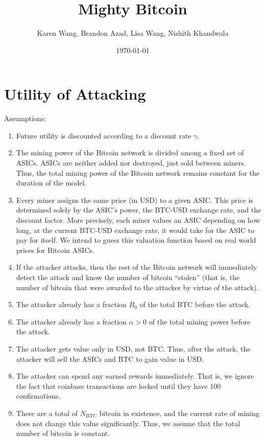 \documentclass[12pt]{article}
\title{Mighty Bitcoin}
\author{Karen Wang, Brandon Azad, Lisa Wang, Nishith Khandwala}
\date{\today}
\newcommand*{\ABtcOrig}{{B_0}}
\newcommand*{\NumBtc}{{N_{\mathrm{BTC}}}}
\begin{document}
\maketitle

\section{Utility of Attacking}

Assumptions:
\begin{enumerate}
  \item
    Future utility is discounted according to a discount rate $\gamma$.
  \item
    The mining power of the Bitcoin network is divided among a fixed set of
    ASICs. ASICs are neither added nor destroyed, just sold between miners.
    Thus, the total mining power of the Bitcoin network remains constant for
    the duration of the model.
  \item
    Every miner assigns the same price (in USD) to a given ASIC. This price is
    determined solely by the ASIC's power, the BTC-USD exchange rate, and the
    discount factor.
    More precisely, each miner values an ASIC depending on how long, at the
    current BTC-USD exchange rate, it would take for the ASIC to pay for
    itself. We intend to guess this valuation function based on real world
    prices for Bitcoin ASICs.
  \item
    If the attacker attacks, then the rest of the Bitcoin network will
    immediately detect the attack and know the number of bitcoin ``stolen''
    (that is, the number of bitcoin that were awarded to the attacker by virtue
    of the attack).
  \item
    The attacker already has a fraction $\ABtcOrig$ of the total BTC
    before the attack.
  \item
    The attacker already has a fraction $\alpha > 0$ of the total mining power
    before the attack.
  \item
    The attacker gets value only in USD, not BTC. Thus, after the attack, the
    attacker will sell the ASICs and BTC to gain value in USD.
  \item
    The attacker can spend any earned rewards immediately. That is, we ignore
    the fact that coinbase transactions are locked until they have 100
    confirmations.
  \item
    There are a total of $\NumBtc$ bitcoin in existence, and the current rate
    of mining does not change this value significantly. Thus, we assume that
    the total number of bitcoin is constant.
\end{enumerate}
\end{document}
